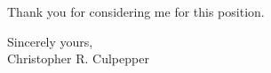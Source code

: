 \documentclass[line]{res}
\begin{document}
\begin{resume}
\noindent 
 
\noindent Thank you for considering me for this position. 
 
Sincerely yours,
\\
Christopher R. Culpepper
\end{resume}
\end{document}

